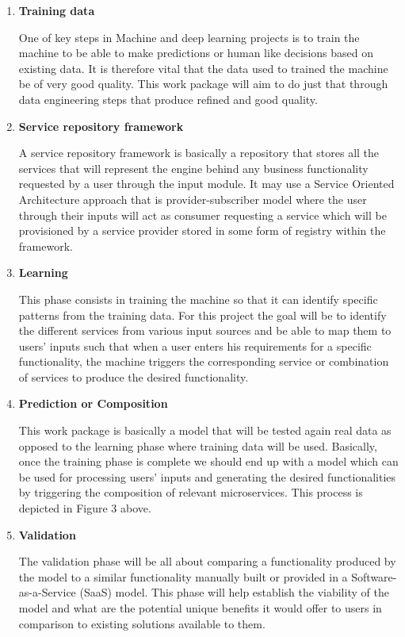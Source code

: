\documentclass{article}
\begin{document}
\begin{enumerate}
\item \textbf{Training data}


One of key steps in Machine and deep learning projects is to train the machine to be able to make predictions or human like decisions based on existing data. It is therefore vital that the data used to trained the machine be of very good quality. This work package will aim to do just that through data engineering steps that produce refined and good quality.


\item \textbf{Service repository framework}


A service repository framework is basically a repository that stores all the services that will represent the engine behind any business functionality requested by a user through the input module. It may use a Service Oriented Architecture approach that is provider-subscriber model where the user through their inputs will act as consumer requesting a service which will be provisioned by a service provider stored in some form of registry within the framework.


\item \textbf{Learning}


This phase consists in training the machine so that it can identify specific patterns from the training data. For this project the goal will be to identify the different services from various input sources and be able to map them to users’ inputs such that when a user enters his requirements for a specific functionality, the machine triggers the corresponding service or combination of services to produce the desired functionality.


\item \textbf{Prediction or Composition}


This work package is basically a model that will be tested again real data as opposed to the learning phase where training data will be used. Basically, once the training phase is complete we should end up with a model which can be used for processing users’ inputs and generating the desired functionalities by triggering the composition of relevant microservices. This process is depicted in Figure 3 above.


\item \textbf{Validation}


The validation phase will be all about comparing a functionality produced by the model to a similar functionality manually built or provided in a Software-as-a-Service (SaaS) model. This phase will help establish the viability of the model and what are the potential unique benefits it would offer to users in comparison to existing solutions available to them.

\end{enumerate}
\end{document}
